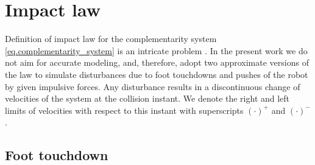 \chapter{Impact law}
\label{app.collision}
\acresetall

Definition of impact law for the complementarity system
\cref{eq.complementarity_system} is an intricate problem \cite{Glocker2006nms}.
In the present work we do not aim for accurate modeling, and, therefore, adopt
two approximate versions of the law to simulate disturbances due to foot
touchdowns and pushes of the robot by given impulsive forces. Any disturbance
results in a discontinuous change of velocities of the system at the collision
instant. We denote the right and left limits of velocities with respect to this
instant with superscripts $(\cdot)^+$ and $(\cdot)^-$.



\section{Foot touchdown}

